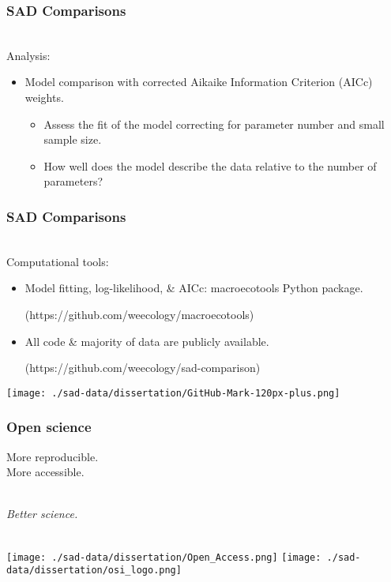 \documentclass[14pt]{beamer}
\begin{document}
\begin{frame}[t]
\frametitle{SAD Comparisons}
~\\
Analysis:
\begin{itemize}
\item Model comparison with corrected Aikaike Information Criterion (AICc) weights.
\begin{itemize}
\item Assess the fit of the model correcting for parameter number and small sample size.
\item How well does the model describe the data relative to the number of parameters?
\end{itemize}
\end{itemize}
\end{frame}

\begin{frame}
\frametitle{SAD Comparisons}
~\\
Computational tools:
\begin{itemize}
\item Model fitting, log-likelihood, \& AICc: macroecotools Python package.\\
\begin{small}
(https://github.com/weecology/macroecotools)
\end{small}
\item All code \& majority of data are publicly available.
\begin{small}
(https://github.com/weecology/sad-comparison)
\end{small}
\end{itemize}
\begin{center}
\texttt{[image: ./sad-data/dissertation/GitHub-Mark-120px-plus.png]}
\end{center}
\end{frame}

\begin{frame}
\frametitle{Open science}
\begin{Large}
More reproducible.\\
More accessible.\\
~\\
\begin{huge}
\emph{Better science.}
~\\
~\\
\end{huge}
\end{Large}
\begin{center}
\texttt{[image: ./sad-data/dissertation/Open\_Access.png]}  
\texttt{[image: ./sad-data/dissertation/osi\_logo.png]}

\end{center}
\end{frame}
\end{document}

